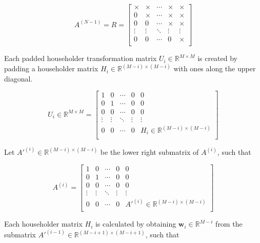 \documentclass{article}
\begin{document}
\begin{equation}
A^{(N-1)} = R =
\begin{bmatrix}
\times & \times & \cdots & \times & \times\\
0 & \times  & \cdots & \times & \times\\
0 & 0 & \cdots & \times & \times\\
\vdots & \vdots  & \ddots & \vdots & \vdots\\
0 & 0  & \cdots & 0 & \times\\
\end{bmatrix}
\end{equation}

Each padded householder transformation matrix $U_{i}\in\mathbb{R}^{M\times{}M}$ is created by padding a householder matrix $H_{i}\in\mathbb{R}^{(M-i)\times{}(M-i)}$ with ones along the upper diagonal.

\begin{equation}
U_{i}\in\mathbb{R}^{M\times{}M} =
\begin{bmatrix}
1 & 0 & \cdots & 0  & 0\\
0 & 1  & \cdots & 0 & 0\\
0 & 0 & \cdots & 0 & 0\\
\vdots & \vdots  & \ddots & \vdots & \vdots\\
0 & 0  & \cdots & 0 & H_{i}\in\mathbb{R}^{(M-i)\times{}(M-i)}\\
\end{bmatrix}
\end{equation}

Let $A'^{(i)}\in\mathbb{R}^{(M-i)\times{}(M-i)}$ be the lower right submatrix of $A^{(i)}$, such that

\begin{equation}
A^{(i)} =
\begin{bmatrix}
1 & 0 & \cdots & 0  & 0\\
0 & 1  & \cdots & 0 & 0\\
0 & 0 & \cdots & 0 & 0\\
\vdots & \vdots  & \ddots & \vdots & \vdots\\
0 & 0  & \cdots & 0 & A'^{(i)}\in\mathbb{R}^{(M-i)\times{}(M-i)}\\
\end{bmatrix}
\end{equation}

Each householder matrix $H_{i}$ is calculated by obtaining $\mathbf{w}_i\in\mathbb{R}^{M-i}$ from the submatrix $A'^{(i-1)}\in\mathbb{R}^{(M-i+1)\times{}(M-i+1)}$, such that
\end{document}
